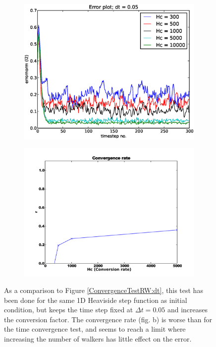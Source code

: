 \begin{figure}[h]
 \centering
 \begin{subfigure}[t]{0.48\textwidth}
  \includegraphics[width=\textwidth]{../results/experiment_02052014_0747_Redoing_RW_tests_Hc/results/errorplot.eps}
 \end{subfigure}
\begin{subfigure}[t]{0.48\textwidth}
 \includegraphics[width=\textwidth]{../results/experiment_02052014_0747_Redoing_RW_tests_Hc/results/ConvergenceTest_pretty.pdf}
\end{subfigure}
\caption[Test RW]{As a comparison to Figure \ref{ConvergenceTestRW:dt}, this test has been done for the same 1D Heaviside step function as initial condition, but keeps the time step fixed at $\Delta t = 0.05$ and increases the conversion factor. The convergence rate (fig. b) is worse than for the time convergence test, and seems to reach a limit where increasing the number of walkers has little effect on the error.}
\label{ConvergenceTestRW:Hc}
\end{figure}
\clearpage

